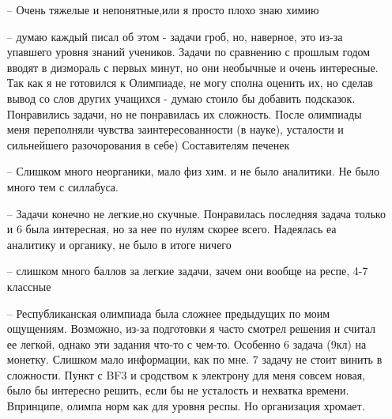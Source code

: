 \begin{itemize}
    \item[--] Очень тяжелые и непонятные,или я просто плохо знаю химию
    \item[--] думаю каждый писал об этом - задачи гроб, но, наверное, это из-за упавшего уровня знаний учеников. Задачи по сравнению с прошлым годом вводят в дизмораль с первых минут, но они необычные и очень интересные. Так как я не готовился к Олимпиаде, не могу сполна оценить их, но сделав вывод со слов других учащихся - думаю стоило бы добавить подсказок. Понравились задачи, но не понравилась их сложность. После олимпиады меня переполняли чувства заинтересованности (в науке), усталости и сильнейшего разочорования в себе) Составителям печенек
    \item[--] Слишком много неорганики, мало физ хим. и не было аналитики. Не было много тем с силлабуса.
    \item[--] Задачи конечно не легкие,но скучные. Понравилась последняя задача только и 6 была интересная, но за нее по нулям скорее всего. Надеялась еа аналитику и органику, не было в итоге ничего
    \item[--] слишком много баллов за легкие задачи, зачем они вообще на респе, 4-7 классные
    \item[--] Республиканская олимпиада была сложнее предыдущих по моим ощущениям. Возможно, из-за подготовки я часто смотрел решения и считал ее легкой, однако эти задания что-то с чем-то. Особенно 6 задача (9кл) на монетку. Слишком мало информации, как по мне. 7 задачу не стоит винить в сложности. Пункт с BF3 и сродством к электрону для меня совсем новая, было бы интересно решить, если бы не усталость и нехватка времени. Впринципе, олимпа норм как для уровня респы. Но организация хромает.
\end{itemize}